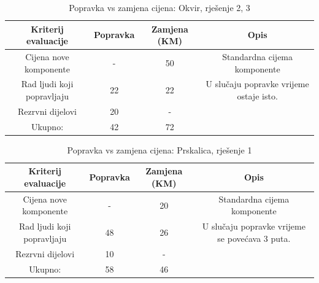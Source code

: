 \documentclass[12pt]{article}
\begin{document}
\begin{landscape}
    \vspace*{\fill}
\begin{table}[htbp]
  \centering
  \footnotesize
  \caption{Popravka vs zamjena cijena: Okvir, rješenje 2, 3}
    \begin{tabular}{cccc}
    \toprule
    Kriterij evaluacije & Popravka & Zamjena (KM) & Opis \\
    \midrule
     Cijena nove komponente & -     & 50    & \multicolumn{1}{p{23.215em}}{Standardna \newline{}cijema\newline{} komponente} \\
    \midrule
    Rad ljudi koji popravljaju & 22    & 22    & \multicolumn{1}{p{23.215em}}{U slučaju popravke vrijeme ostaje isto. } \\
    \midrule
    Rezrvni dijelovi & 20    & -     &  \\
    \midrule
    Ukupno: & 42    & 72    &  \\
    \bottomrule
    \end{tabular}%
  \label{tab:addlabel}%
\end{table}%

\begin{table}[htbp]
  \centering
    \footnotesize
  \caption{Popravka vs zamjena cijena: Prskalica, rješenje 1}
    \begin{tabular}{cccc}
    \toprule
    Kriterij evaluacije & Popravka & Zamjena (KM) & Opis \\
    \midrule
     Cijena nove komponente & -     & 20    & \multicolumn{1}{p{19.57em}}{Standardna \newline{}cijema\newline{} komponente} \\
    \midrule
    Rad ljudi koji popravljaju & 48    & 26    & \multicolumn{1}{p{19.57em}}{ U slučaju popravke vrijeme se povećava 3 puta. } \\
    \midrule
    Rezrvni dijelovi & 10    & -     &  \\
    \midrule
    Ukupno: & 58    & 46    &  \\
    \bottomrule
    \end{tabular}%
  \label{tab:addlabel}%
\end{table}%

    \vspace*{\fill}
\end{landscape}
\end{document}
